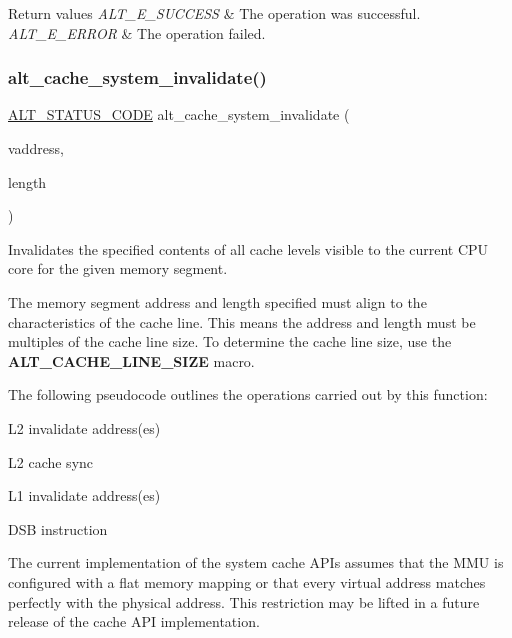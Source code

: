 \begin{DoxyRetVals}{Return values}
{\em A\+L\+T\+\_\+\+E\+\_\+\+S\+U\+C\+C\+E\+SS} & The operation was successful. \\
\hline
{\em A\+L\+T\+\_\+\+E\+\_\+\+E\+R\+R\+OR} & The operation failed. \\
\hline
\end{DoxyRetVals}
\mbox{\label{group__CACHE__SYS_ga50d87865a68390d96a7f5ddadb465d16}} 
\subsubsection{\texorpdfstring{alt\_cache\_system\_invalidate()}{alt\_cache\_system\_invalidate()}}
{\footnotesize\ttfamily \mbox{\hyperlink{hwlib_8h_abdb0d369f069723ca55d6c94bcaaaa12}{A\+L\+T\+\_\+\+S\+T\+A\+T\+U\+S\+\_\+\+C\+O\+DE}} alt\+\_\+cache\+\_\+system\+\_\+invalidate (\begin{DoxyParamCaption}\item[{void $\ast$}]{vaddress,  }\item[{size\+\_\+t}]{length }\end{DoxyParamCaption})}

Invalidates the specified contents of all cache levels visible to the current C\+PU core for the given memory segment.

The memory segment address and length specified must align to the characteristics of the cache line. This means the address and length must be multiples of the cache line size. To determine the cache line size, use the {\bfseries{A\+L\+T\+\_\+\+C\+A\+C\+H\+E\+\_\+\+L\+I\+N\+E\+\_\+\+S\+I\+ZE}} macro.

The following pseudocode outlines the operations carried out by this function\+:
\begin{DoxyEnumerate}
\item L2 invalidate address(es)
\item L2 cache sync
\item L1 invalidate address(es)
\item D\+SB instruction
\end{DoxyEnumerate}

The current implementation of the system cache A\+P\+Is assumes that the M\+MU is configured with a flat memory mapping or that every virtual address matches perfectly with the physical address. This restriction may be lifted in a future release of the cache A\+PI implementation.


